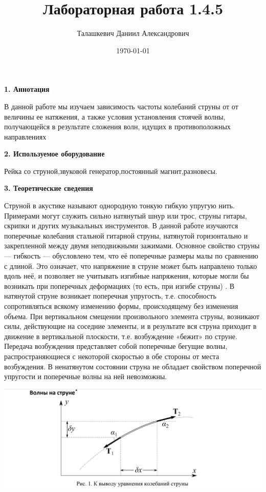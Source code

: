 \documentclass[a4paper,12pt]{article} %
\author{Талашкевич Даниил Александрович}
\title{Лабораторная работа 1.4.5}
\date{\today}
\begin{document}
\maketitle
\thispagestyle{empty}

\newpage
\setcounter{page}{1}


{\bf 1. Аннотация}

В данной работе мы изучаем зависимость частоты колебаний струны от от величины ее натяжения, а также условия установления стоячей волны, получающейся в результате сложения волн,
идущих в противоположных направлениях

{\bf 2. Используемое оборудование}

Рейка со струной,звуковой генератор,постоянный магнит,разновесы.

{\bf 3. Теоретические сведения}

Струной в акустике называют однородную тонкую гибкую упругую нить.
Примерами могут служить сильно натянутый шнур или трос, струны гитары,
скрипки и других музыкальных инструментов. В данной работе изучаются
поперечные колебания стальной гитарной струны, натянутой горизонтально
и закрепленной между двумя неподвижными зажимами.
Основное свойство струны — гибкость — обусловлено тем, что её поперечные размеры малы по сравнению с длиной. Это означает, что напряжение
в струне может быть направлено только вдоль неё, и позволяет не учитывать
изгибные напряжения, которые могли бы возникать при поперечных деформациях (то есть, при изгибе струны)
.
В натянутой струне возникает поперечная упругость, т.е. способность сопротивляться всякому изменению формы, происходящему без изменения
объема. При вертикальном смещении произвольного элемента струны, возникают силы, действующие на соседние элементы, и в результате вся струна
приходит в движение в вертикальной плоскости, т.е. возбуждение «бежит» по
струне. Передача возбуждения представляет собой поперечные бегущие
волны, распространяющиеся с некоторой скоростью в обе стороны от места
возбуждения. В ненатянутом состоянии струна не обладает свойством поперечной упругости и поперечные волны на ней невозможны.

\includegraphics[width=\textwidth]{1.4.5 1}
\end{document}
